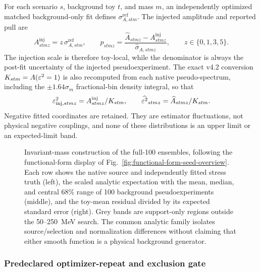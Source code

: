 For each scenario $s$, background toy $t$, and mass $m$, an independently optimized
matched background-only fit defines $\sigma^{\mathrm{ref}}_{A,stm}$.  The injected
amplitude and reported pull are
\begin{equation}
 A^{\mathrm{inj}}_{stmz}=z\,\sigma^{\mathrm{ref}}_{A,stm},
 \qquad
 p_{stmz}=\frac{\widehat A_{stmz}-A^{\mathrm{inj}}_{stmz}}
 {\widehat\sigma_{A,stmz}},
 \qquad z\in\{0,1,3,5\}.
 \label{eq:v4p6-refmatched-pull}
\end{equation}
The injection scale is therefore toy-local, while the denominator is always the
post-fit uncertainty of the injected pseudoexperiment.  The exact v4.2 conversion
$K_{stm}=A(\varepsilon^2=1)$ is also recomputed from each native pseudo-spectrum, including
the $\pm1.64\sigma_m$ fractional-bin density integral, so that
\begin{equation}
 \varepsilon^2_{\mathrm{inj},stmz}=A^{\mathrm{inj}}_{stmz}/K_{stm},
 \qquad
 \widehat{\varepsilon^2}_{stmz}=\widehat A_{stmz}/K_{stm}.
 \label{eq:v4p6-eps2-coordinate}
\end{equation}
Negative fitted coordinates are retained.  They are estimator fluctuations, not
physical negative couplings, and none of these distributions is an upper limit or an
expected-limit band.

\begin{figure}[p]
\centering
{}
\caption{Invariant-mass construction of the full-100 ensembles, following the
functional-form display of Fig.~\ref{fig:functional-form-seed-overview}.  Each row
shows the native source and independently fitted stress truth (left), the scaled
analytic expectation with the mean, median, and central 68\% range of 100 background
pseudoexperiments (middle), and the toy-mean residual divided by its expected standard
error (right).  Grey bands are support-only regions outside the 50--250~MeV search.
The common analytic family isolates source/selection and normalization differences
without claiming that either smooth function is a physical background generator.}
\label{fig:v4p6-functional-form-exposure-distributions}
\end{figure}

\subsubsection{Predeclared optimizer-repeat and exclusion gate}

